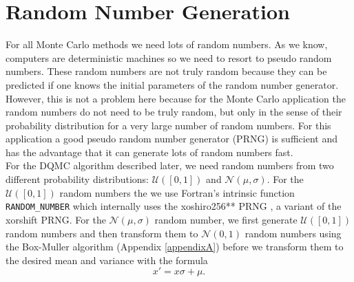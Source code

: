 \documentclass [12pt]{report}
\begin{document}
\section{Random Number Generation}
For all Monte Carlo methods we need lots of random numbers. As we know, computers are deterministic machines so we need to resort to pseudo random numbers. These random numbers are not truly random because they can be predicted if one knows the initial parameters of the random number generator. However, this is not a problem here because for the Monte Carlo application the random numbers do not need to be truly random, but only in the sense of their probability distribution for a very large number of random numbers. For this application a good pseudo random number generator (PRNG) is sufficient and has the advantage that it can generate lots of random numbers fast.\\
For the DQMC algorithm described later, we need random numbers from two different probability distributions: $\mathcal{U}([0,1])$ and $\mathcal{N}(\mu,\sigma)$. For the $\mathcal{U}([0,1])$ random numbers the we use Fortran's intrinsic function \verb|RANDOM_NUMBER| which internally uses the xoshiro256** PRNG \cite{prng}, a variant of the xorshift PRNG. For the $\mathcal{N}(\mu,\sigma)$ random number, we first generate $\mathcal{U}([0,1])$ random numbers and then transform them to $\mathcal{N}(0,1)$ random numbers using the Box-Muller algorithm (Appendix \ref{appendixA}) before we transform them to the desired mean and variance with the formula 
\begin{equation}
x' = x \sigma + \mu.
\end{equation}
\end{document}
